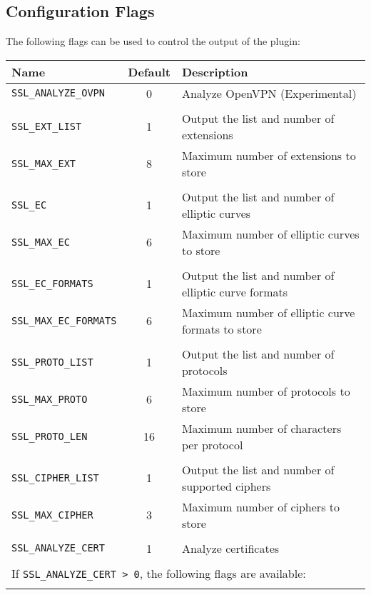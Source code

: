 \documentclass[documentation]{subfiles}
\begin{document}
\subsection{Configuration Flags}
The following flags can be used to control the output of the plugin:
\begin{longtable}{lcl}
    \toprule
    {\bf Name} & {\bf Default} & {\bf Description}\\
    \midrule\endhead%
    {\tt SSL\_ANALYZE\_OVPN}  & 0 & Analyze OpenVPN (Experimental)\\\\

    {\tt SSL\_EXT\_LIST} & 1 & Output the list and number of extensions\\
    {\tt SSL\_MAX\_EXT}  & 8 & Maximum number of extensions to store\\\\

    {\tt SSL\_EC}      & 1 & Output the list and number of elliptic curves\\
    {\tt SSL\_MAX\_EC} & 6 & Maximum number of elliptic curves to store\\\\

    {\tt SSL\_EC\_FORMATS}      & 1 & Output the list and number of elliptic curve formats\\
    {\tt SSL\_MAX\_EC\_FORMATS} & 6 & Maximum number of elliptic curve formats to store\\\\

    {\tt SSL\_PROTO\_LIST} &  1 & Output the list and number of protocols\\
    {\tt SSL\_MAX\_PROTO}  &  6 & Maximum number of protocols to store\\
    {\tt SSL\_PROTO\_LEN}  & 16 & Maximum number of characters per protocol\\\\

    {\tt SSL\_CIPHER\_LIST} & 1 & Output the list and number of supported ciphers\\
    {\tt SSL\_MAX\_CIPHER}  & 3 & Maximum number of ciphers to store\\\\

    {\tt SSL\_ANALYZE\_CERT} & 1 & Analyze certificates\\\\

    \multicolumn{3}{l}{If {\tt SSL\_ANALYZE\_CERT > 0}, the following flags are available:}\\\\


\end{longtable}
\end{document}
